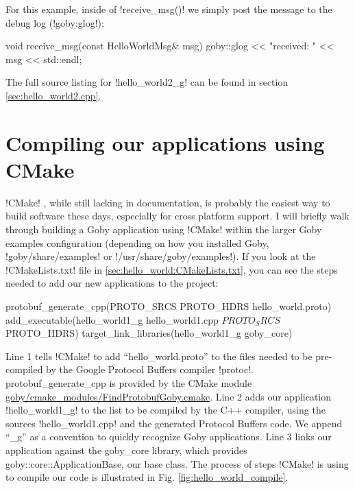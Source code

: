 For this example, inside of !receive_msg()! we simply post the message to the debug log (!goby:glog!):

\begin{boxedverbatim}
void receive_msg(const HelloWorldMsg& msg)
{
   goby::glog << "received: " << msg << std::endl;
}
\end{boxedverbatim}
\resetbvlinenumber

The full source listing for !hello_world2_g! can be found in section \ref{sec:hello_world2.cpp}.

\section{Compiling our applications using CMake}

!CMake! \cite{cmake}, while still lacking in documentation, is probably the easiest way to build software these days, especially for cross platform support. I will briefly walk through building a Goby application using !CMake! within the larger Goby examples configuration (depending on how you installed Goby, !goby/share/examples! or !/usr/share/goby/examples!). If you look at the !CMakeLists.txt! file in \ref{sec:hello_world:CMakeLists.txt}, you can see the steps needed to add our new applications to the project:

\begin{boxedverbatim}
protobuf_generate_cpp(PROTO_SRCS PROTO_HDRS hello_world.proto)
add_executable(hello_world1_g hello_world1.cpp ${PROTO_SRCS} ${PROTO_HDRS})
target_link_libraries(hello_world1_g goby_core)
\end{boxedverbatim}
\resetbvlinenumber

Line 1 tells !CMake! to add ``hello\_world.proto'' to the files needed to be pre-compiled by the Google Protocol Buffers compiler !protoc!. protobuf\_generate\_cpp is provided by the CMake module \href{http://bazaar.launchpad.net/~goby-dev/goby/trunk/annotate/head:/cmake_modules/FindProtobufGoby.cmake}{goby/cmake\_modules/FindProtobufGoby.cmake}. Line 2 adds our application !hello_world1_g! to the list to be compiled by the C++ compiler, using the sources !hello_world1.cpp! and the generated Protocol Buffers code. We append ``\_g'' as a convention to quickly recognize Goby applications. Line 3 links our application against the goby\_core library, which provides goby::core::ApplicationBase, our base class. The process of steps !CMake! is using to compile our code is illustrated in Fig. \ref{fig:hello_world_compile}.

